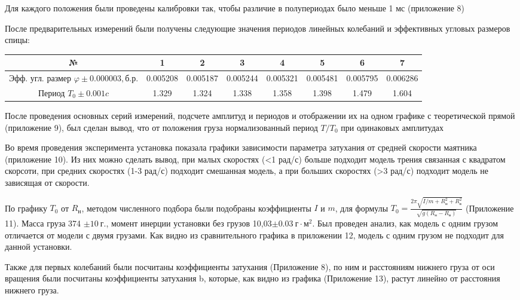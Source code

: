 \documentclass[a4paper]{article}
\begin{document}
Для каждого положения были проведены калибровки так, чтобы различие в полупериодах было меньше 1 мс (приложение 8)

После предварительных измерений были получены следующие значения периодов линейных колебаний и эффективных угловых размеров спицы:

\begin{table}[h]
\begin{tabular}{|c|c|c|c|c|c|c|c|}
\hline
№                          & 1              & 2              & 3              & 4              & 5              & 6              & 7              \\ \hline
Эфф. угл. размер $\varphi \pm 0.000003, б.р.$ & 0.005208 & 0.005187 & 0.005244 & 0.005321 & 0.005481  & 0.005795 & 0.006286 \\ \hline
Период $T_0 \pm 0.001 c$         & 1.329 & 1.324 & 1.338 & 1.358 & 1.398 & 1.479 & 1.604 \\ \hline
\end{tabular}
\end{table}

После проведения основных серий измерений, подсчете амплитуд и периодов и отображении их на одном графике с теоретической прямой (приложение 9), был сделан вывод, что от положения груза нормализованный период $T/T_0$ при одинаковых амплитудах

Во время проведения эксперимента установка показала графики зависимости параметра затухания от средней скорости маятника (приложение 10). Из них можно сделать вывод, при малых скоростях (<1 рад/с) больше подходит модель трения связанная с квадратом скорсоти, при средних скоростях (1-3 рад/с) подходит смешанная модель, а при больших скоростях (>3 рад/с) подходит модель не зависящая от скорости. 

По графику $T_0$ от $R_н$, методом численного подбора были подобраны коэффициенты $I$ и  $m$, для формулы $T_0=\frac{2\pi \sqrt{I/m+R_н^2 + R_в^2}}{\sqrt{g(R_н-R_в)}}$ (Приложение 11). Масса груза 374 $\pm10 \ г.$, момент инерции установки без грузов 10,03$\pm0.03 \ г \cdot м^2$. Был проведен анализ, как модель с одним грузом отличается от модели с двумя грузами. Как видно из сравнительного графика в приложении 12, модель с одним грузом не подходит для данной установки.

Также для первых колебаний были посчитаны коэффициенты затухания (Приложение 8), по ним и расстояниям нижнего груза от оси вращения были посчитаны коэффициенты затухания b, которые, как видно из графика (Приложение 13), растут линейно от расстояния нижнего груза.
\end{document}
